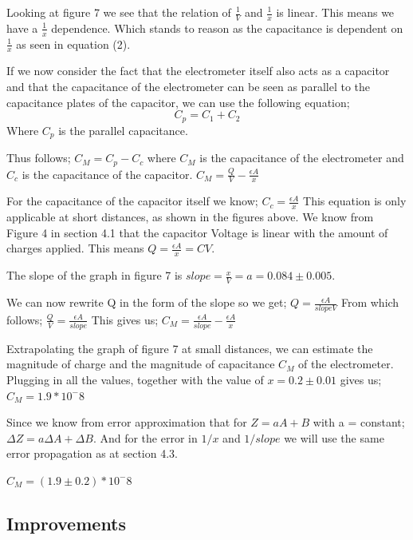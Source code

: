 Looking at figure 7 we see that the relation of $\frac{1}{V}$ and $\frac{1}{x}$ is linear. This means we have a $\frac{1}{x}$ dependence. Which stands to reason as the capacitance is dependent on $\frac{1}{x}$ as seen in equation (2). 

 
If we now consider the fact that the electrometer itself also acts as a capacitor and that the capacitance of the electrometer can be seen as parallel to the capacitance plates of the capacitor, we can use the following equation;  \cite{manual}
\begin{equation} \label{eq:discussion:capacitance_addition}
    C_p= C_1+C_2 
\end{equation}
Where $C_p$ is the parallel capacitance.

Thus follows; $C_M=C_p-C_c$ where $C_M$ is the capacitance of the electrometer and $C_c$ is the capacitance of the capacitor.
$C_M=\frac{Q}{V}-\frac{\epsilon A}{x}$

For the capacitance of the capacitor itself we know; $C_c= \frac{\epsilon A}{x}$ This equation is only applicable at short distances, as shown in the figures above. 
 We know from Figure 4 in section 4.1 that the capacitor Voltage is linear with the amount of charges applied. This means $Q=\frac{\epsilon A}{x}=CV$.

The slope of the graph in figure 7 is $slope=\frac{x}{V}=a= 0.084 \pm 0.005$.  

We can now rewrite Q in the form of the slope so we get; 
$Q=\frac{\epsilon A}{slope V}$
From which follows; $\frac{Q}{V}=\frac{\epsilon A}{slope}$
This gives us; $C_M= \frac{\epsilon A}{slope}-\frac{\epsilon A}{x}$

Extrapolating the graph of figure 7 at small distances, we can estimate the magnitude of charge and the magnitude of capacitance $C_M$ of the electrometer.
Plugging in all the values, together with the value of $x=0.2 \pm 0.01$ gives us; 
$C_M= 1.9*10^-8 $

Since we know from error approximation that for $Z=aA+B$ with a = constant; $\Delta Z= a\Delta A +\Delta B$. And for the error in $1/x$ and $1/slope$ we will use the same error propagation as at section 4.3.

$C_M=(1.9 \pm 0.2)*10^-8 $
 


\subsection{Improvements}

